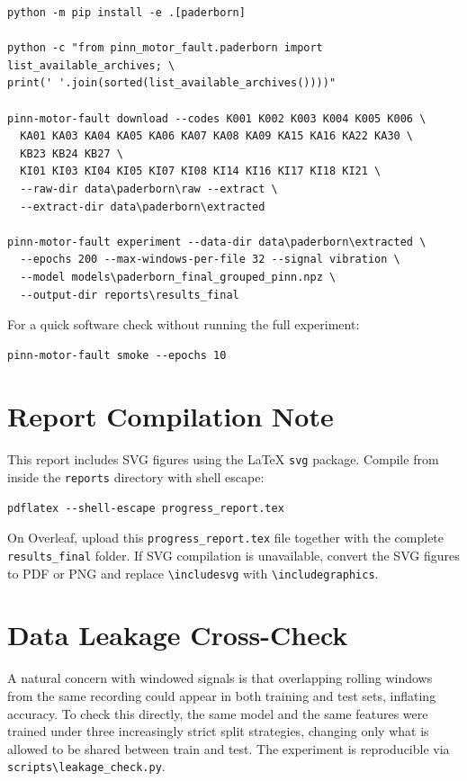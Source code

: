 \documentclass[11pt,a4paper]{article}
\begin{document}
\begin{verbatim}
python -m pip install -e .[paderborn]

python -c "from pinn_motor_fault.paderborn import list_available_archives; \
print(' '.join(sorted(list_available_archives())))"

pinn-motor-fault download --codes K001 K002 K003 K004 K005 K006 \
  KA01 KA03 KA04 KA05 KA06 KA07 KA08 KA09 KA15 KA16 KA22 KA30 \
  KB23 KB24 KB27 \
  KI01 KI03 KI04 KI05 KI07 KI08 KI14 KI16 KI17 KI18 KI21 \
  --raw-dir data\paderborn\raw --extract \
  --extract-dir data\paderborn\extracted

pinn-motor-fault experiment --data-dir data\paderborn\extracted \
  --epochs 200 --max-windows-per-file 32 --signal vibration \
  --model models\paderborn_final_grouped_pinn.npz \
  --output-dir reports\results_final
\end{verbatim}

For a quick software check without running the full experiment:
\begin{verbatim}
pinn-motor-fault smoke --epochs 10
\end{verbatim}

\section{Report Compilation Note}
This report includes SVG figures using the LaTeX \texttt{svg} package. Compile from inside the \texttt{reports} directory with shell escape:
\begin{verbatim}
pdflatex --shell-escape progress_report.tex
\end{verbatim}

On Overleaf, upload this \texttt{progress\_report.tex} file together with the complete \texttt{results\_final} folder. If SVG compilation is unavailable, convert the SVG figures to PDF or PNG and replace \texttt{\textbackslash includesvg} with \texttt{\textbackslash includegraphics}.

\section{Data Leakage Cross-Check}
A natural concern with windowed signals is that overlapping rolling windows from the same
recording could appear in both training and test sets, inflating accuracy. To check this
directly, the same model and the same features were trained under three increasingly strict
split strategies, changing only what is allowed to be shared between train and test. The
experiment is reproducible via \texttt{scripts\textbackslash leakage\_check.py}.
\end{document}
